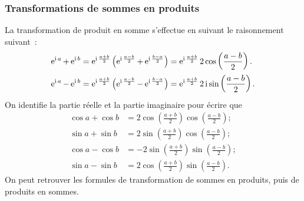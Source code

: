 \subsubsection{Transformations de sommes en produits}
\label{subsubsec:sommeprod}
La transformation de produit en somme s'effectue en suivant le raisonnement 
suivant~:
\begin{align}
    \operatorname{e}^{\operatorname{i} a}+\operatorname{e}^{\operatorname{i} b} &= \operatorname{e}^{\operatorname{i} \frac{a+b}{2}} \left(\operatorname{e}^{\operatorname{i} \frac{a-b}{2}} 
    + \operatorname{e}^{\operatorname{i} \frac{b-a}{2}}\right)  =  \operatorname{e}^{\operatorname{i} \frac{a+b}{2}} 2\cos 
    \left(\frac{a-b}{2} \right).\\
    \operatorname{e}^{\operatorname{i} a}-\operatorname{e}^{\operatorname{i} b} &= \operatorname{e}^{\operatorname{i} \frac{a+b}{2}} \left( 
    \operatorname{e}^{\operatorname{i} \frac{a-b}{2}} - \operatorname{e}^{\operatorname{i} \frac{b-a}{2}} \right) =  
    \operatorname{e}^{\operatorname{i} \frac{a+b}{2}} 2 \operatorname{i} \sin \left( \frac{a-b}{2} \right).
\end{align}
On identifie la partie réelle et la partie imaginaire pour écrire que
\begin{align}
    \cos a + \cos b &= 2 \cos \left( \frac{a+b}{2} \right) \cos 
    \left(\frac{a-b}{2} \right);\\
    \sin a + \sin b &= 2 \sin \left( \frac{a+b}{2} \right) \cos 
    \left(\frac{a-b}{2} \right);\\
    \cos a - \cos b &= -2 \sin \left( \frac{a+b}{2} \right) \sin 
    \left(\frac{a-b}{2} \right);\\
    \sin a - \sin b &= 2 \cos \left( \frac{a+b}{2} \right) \sin 
    \left(\frac{a-b}{2} \right).
\end{align}
On peut retrouver les formules de transformation de sommes en produits, puis de 
produits en sommes.
